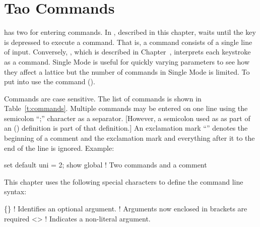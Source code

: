 
\chapter{Tao Commands}
\label{c:command}

\tao has two  for entering commands. In , described in this
chapter, \tao waits until the  key is depressed to execute a command. That is,
a command consists of a single line of input. Conversely, , which is
described in Chapter~, interprets each keystroke as a command. Single Mode
is useful for quickly varying parameters to see how they affect a lattice but the number
of commands in Single Mode is limited. To put \tao into  use the
 command ().

Commands are case sensitive. The list of commands is shown in
Table~\ref{t:commands}. Multiple commands may be entered on one line using the semicolon
``;'' character as a separator.  [However, a semicolon used as as part of an 
() definition is part of that definition.]  An exclamation mark ``\vn{!}''
denotes the beginning of a comment and the exclamation mark and everything after it to the
end of the line is ignored.  Example:
\begin{example}
  set default uni = 2; show global  ! Two commands and a comment
\end{example}

This chapter uses the following special characters to define the command line syntax:
\begin{example}
  \{\}        ! Identifies an optional argument.
            !   Arguments now enclosed in brackets are required
  <>        ! Indicates a non-literal argument.
\end{example}

